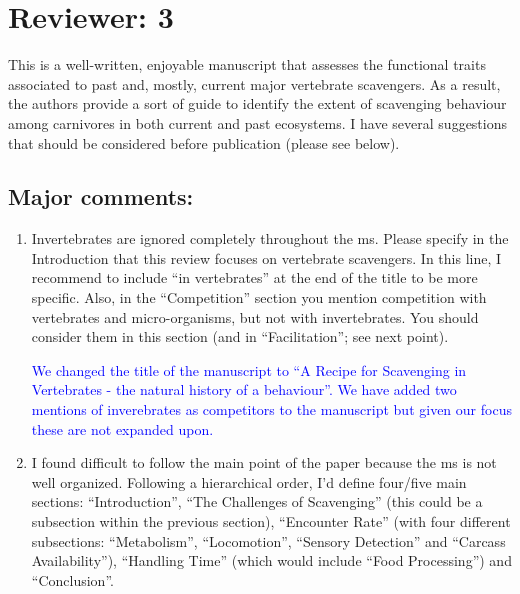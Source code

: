 \documentclass[12pt,letterpaper]{article}
\begin{document}
\section{Reviewer: 3}
This is a well-written, enjoyable manuscript that assesses the functional traits associated to past and, mostly, current major vertebrate scavengers.
As a result, the authors provide a sort of guide to identify the extent of scavenging behaviour among carnivores in both current and past ecosystems.
I have several suggestions that should be considered before publication (please see below).

\subsection{Major comments:}

\begin{enumerate}
\item{Invertebrates are ignored completely throughout the ms.
Please specify in the Introduction that this review focuses on vertebrate scavengers.
In this line, I recommend to include ``in vertebrates'' at the end of the title to be more specific.
Also, in the ``Competition'' section you mention competition with vertebrates and micro-organisms, but not with invertebrates.
You should consider them in this section (and in ``Facilitation''; see next point).}

\textcolor{blue}{We changed the title of the manuscript to ``A Recipe for Scavenging in Vertebrates - the natural history of a behaviour''. We have added two mentions of inverebrates as competitors to the manuscript but given our focus these are not expanded upon.}



\item{I found difficult to follow the main point of the paper because the ms is not well organized. Following a hierarchical order, I'd define four/five main sections: ``Introduction'', ``The Challenges of Scavenging'' (this could be a subsection within the previous section), ``Encounter Rate'' (with four different subsections: ``Metabolism'', ``Locomotion'', ``Sensory Detection'' and ``Carcass Availability''), ``Handling Time'' (which would include ``Food Processing'') and ``Conclusion''. \\ 

}
\end{enumerate}
\end{document}
